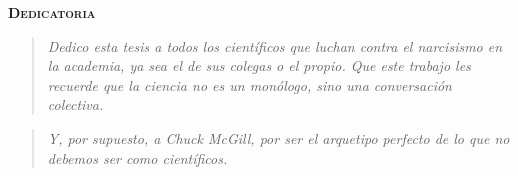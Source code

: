 \newpage
\begin{center}
    {\LARGE \textbf{\textsc{Dedicatoria}}}\\[1cm]
    \begin{quote}
        \textit{
            Dedico esta tesis a todos los científicos que luchan contra el narcisismo en la academia, ya sea el de sus colegas o el propio. Que este trabajo les recuerde que la ciencia no es un monólogo, sino una conversación colectiva.
        }
    \end{quote}
    \vspace{1cm}
    \begin{quote}
        \textit{
            Y, por supuesto, a Chuck McGill, por ser el arquetipo perfecto de lo que no debemos ser como científicos.
        }
    \end{quote}
\end{center}